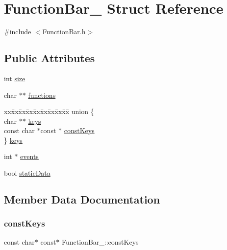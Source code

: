 \hypertarget{structFunctionBar__}{}\section{Function\+Bar\+\_\+ Struct Reference}
\label{structFunctionBar__}


{\ttfamily \#include $<$Function\+Bar.\+h$>$}

\subsection*{Public Attributes}
\begin{DoxyCompactItemize}
\item 
int \hyperlink{structFunctionBar___ac3881206a2253e1c27cd9790973d0671}{size}
\item 
char $\ast$$\ast$ \hyperlink{structFunctionBar___a52387d72e8d1454a5c2eba415a216f06}{functions}
\item 
\begin{tabbing}
xx\=xx\=xx\=xx\=xx\=xx\=xx\=xx\=xx\=\kill
union \{\\
\>char $\ast$$\ast$ \hyperlink{structFunctionBar___aea186dac4246c6e2e6a09f3c0bddbdcb}{keys}\\
\>const char $\ast$const  $\ast$ \hyperlink{structFunctionBar___a502ddea4968ea3ef7245f4ed1fd1ff36}{constKeys}\\
\} \hyperlink{structFunctionBar___a448f4f703b01c4ab1621c3e2e68bc711}{keys}\\

\end{tabbing}\item 
int $\ast$ \hyperlink{structFunctionBar___abaf7ad3c3cac6998fb1b0aa72cf410e5}{events}
\item 
bool \hyperlink{structFunctionBar___aa5e10740801f6fa922ba70314f65cf5c}{static\+Data}
\end{DoxyCompactItemize}


\subsection{Member Data Documentation}
\mbox{\label{structFunctionBar___a502ddea4968ea3ef7245f4ed1fd1ff36}} 
\subsubsection{\texorpdfstring{const\+Keys}{constKeys}}
{\footnotesize\ttfamily const char$\ast$ const$\ast$ Function\+Bar\+\_\+\+::const\+Keys}

